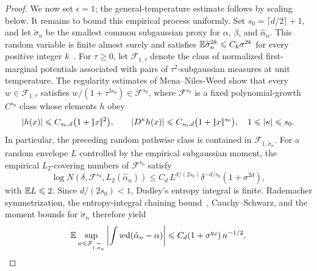 \begin{proof}
	We now set $\epsilon=1$; the general-temperature estimate follows by scaling below. It remains to bound this empirical process uniformly. Set $s_0=\lceil d/2\rceil+1$, and let $\widetilde\sigma_n$ be the smallest common subgaussian proxy for $\alpha$, $\beta$, and $\hat\alpha_n$. This random variable is finite almost surely and satisfies $\mathbb{E}\widetilde\sigma_n^{2k}\leqslant C_k\sigma^{2k}$ for every positive integer $k$~\cite{mena2019statistical}. For $\tau\geq0$, let $\mathcal F_{1,\tau}$ denote the class of normalized first-marginal potentials associated with pairs of $\tau^2$-subgaussian measures at unit temperature. The regularity estimates of Mena--Niles-Weed show that every $w\in\mathcal F_{1,\tau}$ satisfies $w/(1+\tau^{3s_0})\in\mathcal F^{s_0}$, where $\mathcal F^{s_0}$ is a fixed polynomial-growth $C^{s_0}$ class whose elements $h$ obey
	\[
		\left\lvert h(x)\right\rvert\leqslant C_{s_0,d}\bigl(1+|\!| x |\!|^2\bigr),
		\qquad
		\left\lvert D^\kappa h(x)\right\rvert\leqslant C_{s_0,d}\bigl(1+|\!| x |\!|^{s_0}\bigr),
		\quad 1\leqslant|\kappa|\leqslant s_0.
	\]
	In particular, the preceding random pathwise class is contained in $\mathcal F_{1,\widetilde\sigma_n}$. For a random envelope $L$ controlled by the empirical subgaussian moment, the empirical $L_2$-covering numbers of $\mathcal F^{s_0}$ satisfy
	\[
		\log N(\delta,\mathcal F^{s_0},L_2(\hat\alpha_n))
		\leq
		C_d\,L^{d/(2s_0)}\delta^{-d/s_0}(1+\sigma^{2d}),
	\]
	with $\mathbb{E} L\leqslant2$. Since $d/(2s_0)<1$, Dudley's entropy integral is finite. Rademacher symmetrization, the entropy-integral chaining bound~\cite{vanDerVaartWellner1996}, Cauchy--Schwarz, and the moment bounds for $\widetilde\sigma_n$ therefore yield
	\[
	\mathbb{E}\sup_{w\in\mathcal F_{1,\widetilde\sigma_n}}
	\left\lvert\int w\mathrm{d}(\hat\alpha_n-\alpha)\right\rvert
		\leqslant
		C_d(1+\sigma^{q_d})\,n^{-1/2}.
	\]


\end{proof}
